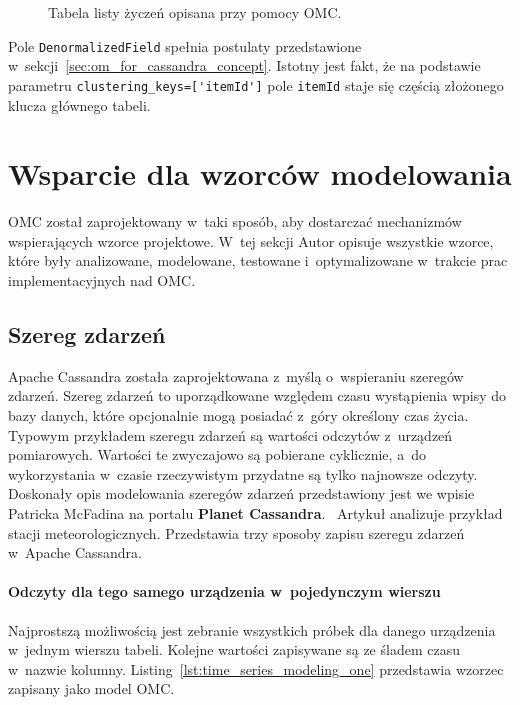 \begin{figure}[ht!]
	\centering
	\theverbbox
	\caption{Tabela listy życzeń opisana przy pomocy OMC.}
	\label{lst:omc_wishlist_definition}
\end{figure}

Pole \verb+DenormalizedField+ spełnia postulaty przedstawione w~sekcji~\ref{sec:om_for_cassandra_concept}. Istotny jest fakt, że na podstawie parametru \verb+clustering_keys=['itemId']+ pole \verb+itemId+ staje się częścią złożonego klucza głównego tabeli.

\section{Wsparcie dla wzorców modelowania}

OMC został zaprojektowany w~taki sposób, aby dostarczać mechanizmów wspierających wzorce projektowe. W~tej sekcji Autor opisuje wszystkie wzorce, które były analizowane, modelowane, testowane i~optymalizowane w~trakcie prac implementacyjnych nad OMC.

\subsection{Szereg zdarzeń}

Apache Cassandra została zaprojektowana z~myślą o~wspieraniu szeregów zdarzeń. Szereg zdarzeń to uporządkowane względem czasu wystąpienia wpisy do bazy danych, które opcjonalnie mogą posiadać z~góry określony czas życia. Typowym przykładem szeregu zdarzeń są wartości odczytów z~urządzeń pomiarowych. Wartości te zwyczajowo są pobierane cyklicznie, a~do wykorzystania w~czasie rzeczywistym przydatne są tylko najnowsze odczyty. Doskonały opis modelowania szeregów zdarzeń przedstawiony jest we wpisie Patricka McFadina na portalu \textbf{Planet Cassandra}.~\cite{time_series_modeling_pattern} Artykuł analizuje przykład stacji meteorologicznych. Przedstawia trzy sposoby zapisu szeregu zdarzeń w~Apache Cassandra. 

\paragraph{Odczyty dla tego samego urządzenia w~pojedynczym wierszu} 

Najprostszą możliwością jest zebranie wszystkich próbek dla danego urządzenia w~jednym wierszu tabeli. Kolejne wartości zapisywane są ze śladem czasu w~nazwie kolumny. Listing~\ref{lst:time_series_modeling_one} przedstawia wzorzec zapisany jako model OMC.

